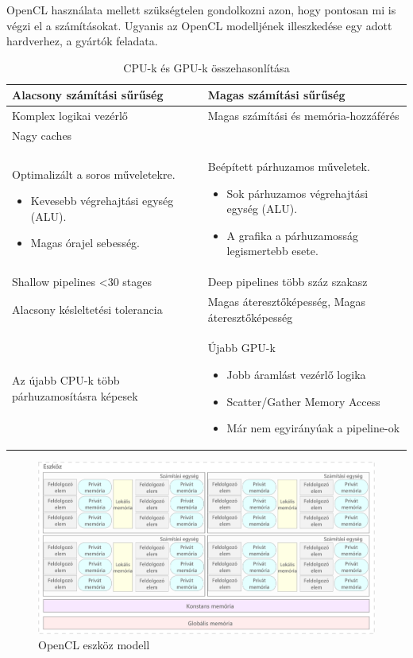 OpenCL használata mellett szükségtelen gondolkozni azon, hogy pontosan mi is végzi el a számításokat. Ugyanis az OpenCL modelljének illeszkedése egy adott hardverhez, a gyártók feladata.

\begin{table}[h!]
\centering
\caption{CPU-k és GPU-k összehasonlítása}
\medskip
\label{tab:cpuvsgpu}
\begin{tabular}{|p{7cm}|p{7cm}|}
\hline
Alacsony számítási sűrűség & Magas számítási sűrűség \\
\hline
Komplex logikai vezérlő & Magas számítási és memória-hozzáférés \\
\hline
Nagy caches &   \\
\hline
Optimalizált a soros műveletekre.
\begin{itemize}
	\item Kevesebb végrehajtási egység (ALU).
	\item Magas órajel sebesség.
\end{itemize} & Beépített párhuzamos műveletek.
\begin{itemize}
	\item Sok párhuzamos végrehajtási egység (ALU).
	\item A grafika a párhuzamosság legismertebb esete.
\end{itemize} \\
\hline
Shallow pipelines <30 stages & Deep pipelines több száz szakasz \\
\hline
Alacsony késleltetési tolerancia & Magas áteresztőképesség, Magas áteresztőképesség \\
\hline
Az újabb CPU-k több párhuzamosításra képesek & Újabb GPU-k
\begin{itemize}
	\item Jobb áramlást vezérlő logika
	\item Scatter/Gather Memory Access
	\item Már nem egyirányúak a pipeline-ok
\end{itemize} \\
\hline
\end{tabular}
\end{table}


\begin{figure}[h!]
\centering
\includegraphics[width=\textwidth]{images/device.png}
\caption{OpenCL eszköz modell}
\label{fig:opencl}
\end{figure}

